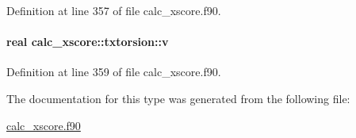 Definition at line 357 of file calc\-\_\-xscore.\-f90.

\hypertarget{structcalc__xscore_1_1txtorsion_ab544eccb9d433f0e931539d940d9d376}{
\paragraph[{v}]{\setlength{\rightskip}{0pt plus 5cm}real calc\-\_\-xscore\-::txtorsion\-::v}}\label{structcalc__xscore_1_1txtorsion_ab544eccb9d433f0e931539d940d9d376}


Definition at line 359 of file calc\-\_\-xscore.\-f90.



The documentation for this type was generated from the following file\-:\begin{DoxyCompactItemize}
\item 
\hyperlink{calc__xscore_8f90}{calc\-\_\-xscore.\-f90}\end{DoxyCompactItemize}
